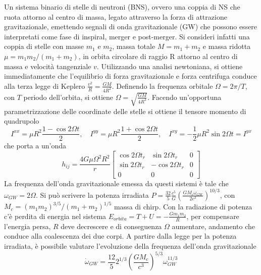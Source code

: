 Un sistema binario di stelle di neutroni (BNS), ovvero una coppia di NS che ruota attorno al centro di massa, legato attraverso la forza di attrazione gravitazionale, emettendo segnali di onda gravitazionale (GW) che possono essere interpretati come fase di inspiral, merger e post-merger. Si consideri infatti una coppia di stelle con masse $m_1$ e $m_2$, massa totale $M = m_1 + m_2$ e massa ridotta $\mu = m_1m_2/(m_1+m_2)$, in orbita circolare di raggio R attorno al centro di massa e velocità tangenziale $v$. Utilizzando una analisi newtoniana, si ottiene immediatamente che l'equilibrio di forza gravitazionale e forza centrifuga conduce alla terza legge di Keplero $\frac{v^2}{R} = \frac{GM}{4R^2}$. Definendo la frequenza orbitale $\Omega=2\pi/T$, con $T$ periodo dell'orbita, si ottiene	$\Omega=\sqrt{\frac{GM}{4R^3}}$. Facendo un'opportuna parametrizzazione delle coordinate delle stelle si ottiene il tensore momento di quadrupolo
\begin{equation}
	I^{xx} = \mu R^2\frac{1-\cos{2\Omega t}}{2}, \quad I^{yy} = \mu R^2\frac{1+\cos{2\Omega t}}{2}, \quad I^{xy}  = -\frac{1}{2}\mu R^2\sin{2\Omega t}= I^{yx}
	\label{eqn:quadrupole_moment}
\end{equation}
che porta a un'onda
\begin{equation}
	h_{ij} = \frac{4G\mu\Omega^2R^2}{r}
	\begin{bmatrix}
	\cos{2\Omega t_r}	&\sin{2\Omega t_r}	&0\\
	\sin{2\Omega t_r}	&-\cos{2\Omega t_r}	&0\\
	0					&0					&0
	\end{bmatrix}
	\label{eqn:wave_form}
\end{equation}
La frequenza dell'onda gravitazionale emessa da questi sistemi è tale che $\omega_{GW} = 2\Omega$.
Si può scrivere la potenza irradiata $P=\frac{32}{5}\frac{c^5}{G}\left(\frac{GM_c\omega_{GW}}{2c^3}\right)^{10/3}$, con $M_c=\left(m_1m_2\right)^{3/5}/\left(m_1+m_2\right)^{1/5}$ massa di chirp. Con la radiazione di potenza c'è perdita di energia nel sistema $E_{orbita} = T + U = -\frac{Gm_1m_2}{R}$, per compensare l'energia persa, $R$ deve decrescere e di conseguenza $\Omega$ aumentare, andamento che conduce alla coalescenza dei due corpi.
A partire dalla legge per la potenza irradiata, è possibile valutare l'evoluzione della frequenza dell'onda gravitazionale 
\begin{equation}
	\dot{\omega}_{GW} = \frac{12}{5}2^{1/3}\left(\frac{GM_c}{c^3}\right)^{5/3}\omega_{GW}^{11/3}
	\label{eqn:gw_frequency_law}
\end{equation} 
